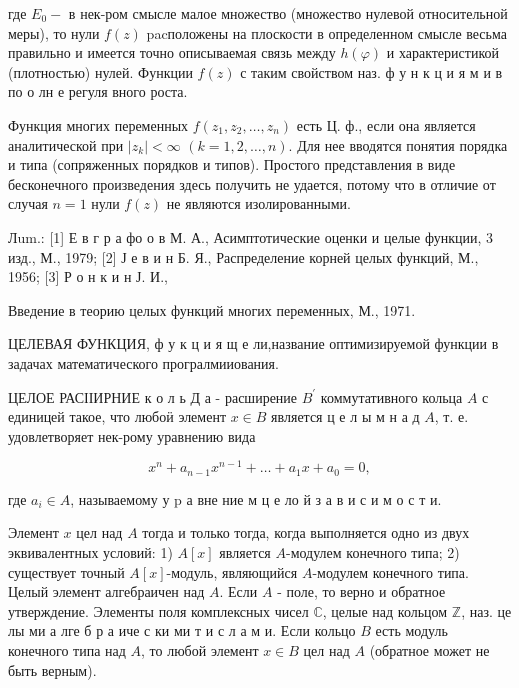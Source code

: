 \documentclass[10pt]{article}
\begin{document}
где $E_{0}-$ в нек-ром смысле малое множество (множество нулевой относительной меры), то нули $f(z)$ pacположены на плоскости в определенном смысле весьма правильно и имеется точно описываемая связь между $h(\varphi)$ и характеристикой (плотностью) нулей. Функции $f(z)$ с таким свойством наз. ф у н к ц и я м и в по о лн е регуля вного роста.



Функция многих переменных $f\left(z_{1}, z_{2}, \ldots, z_{n}\right)$ есть Ц. ф., если она является аналитической при $\left|z_{k}\right|<\infty$ $(k=1,2, \ldots, n)$. Для нее вводятся понятия порядка и типа (сопряженных порядков и типов). Простого представления в виде бесконечного произведения здесь получить не удается, потому что в отличие от случая $n=1$ нули $f(z)$ не являются изолированными.



Лum.: [1] Е в г р а фо о в М. А., Асимптотические оценки и целые функции, 3 изд., М., 1979; [2] Ј е в и н Б. Я., Распределение корней целых функций, М., 1956; [3] Р о н к и н Ј. И.,



Введение в теорию целых функций многих переменных, М., 1971.



ЦЕЛЕВАЯ ФУНКЦИЯ, ф у к ц и я щ е ли,название оптимизируемой функции в задачах математического програлмииования.



ЦЕЛОЕ РАСІІИРНИЕ к о л ь Д а - расширение $B^{\prime}$ коммутативного кольца $A$ с единицей такое, что любоӥ элемент $x \in B$ является ц е л ы м н а д $A$, т. е. удовлетворяет нек-рому уравнению вида



\[

x^{n}+a_{n-1} x^{n-1}+\ldots+a_{1} x+a_{0}=0,

\]



где $a_{i} \in A$, называемому у $\mathrm{p}$ а вне ние м ц е ло й з а в и с и м о с т и.



Элемент $x$ цел над $A$ тогда и только тогда, когда выполняется одно из двух эквивалентных условий: 1) $A[x]$ является $A$-модулем конечного типа; 2) существует точный $A[x]$-модуль, являющийся $A$-модулем конечного типа. Целый элемент алгебраичен над $A$. Если $A$ - поле, то верно и обратное утверждение. Элементы поля комплексных чисел $\mathbb{C}$, целые над кольцом $\mathbb{Z}$, наз. це лы ми а лге б р а иче с ки ми т и с л а м и. Если кольцо $B$ есть модуль конечного типа над $A$, то любой элемент $x \in B$ цел над $A$ (обратное может не быть верным).
\end{document}
